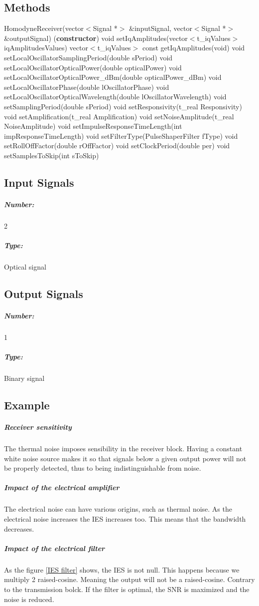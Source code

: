 \pagebreak

\subsection*{Methods}

HomodyneReceiver(vector$<$Signal *$>$ \&inputSignal, vector$<$Signal *$>$
\&outputSignal) (\textbf{constructor})
\bigbreak
void setIqAmplitudes(vector$<$t\_iqValues$>$ iqAmplitudesValues)
\bigbreak
vector$<$t\_iqValues$>$ const getIqAmplitudes(void)
\bigbreak
void setLocalOscillatorSamplingPeriod(double sPeriod)
\bigbreak
void setLocalOscillatorOpticalPower(double opticalPower)
\bigbreak
void setLocalOscillatorOpticalPower\_dBm(double opticalPower\_dBm)
\bigbreak
void setLocalOscillatorPhase(double lOscillatorPhase)
\bigbreak
void setLocalOscillatorOpticalWavelength(double lOscillatorWavelength)
\bigbreak
void setSamplingPeriod(double sPeriod)
\bigbreak
void  setResponsivity(t\_real Responsivity)
\bigbreak
void setAmplification(t\_real Amplification)
\bigbreak
void setNoiseAmplitude(t\_real NoiseAmplitude)
\bigbreak
void setImpulseResponseTimeLength(int impResponseTimeLength)
\bigbreak
void setFilterType(PulseShaperFilter fType)
\bigbreak
void setRollOffFactor(double rOffFactor)
\bigbreak
void setClockPeriod(double per)
\bigbreak
void setSamplesToSkip(int sToSkip)


\subsection*{Input Signals}

\subparagraph*{Number:} 2

\subparagraph*{Type:} Optical signal

\subsection*{Output Signals}

\subparagraph*{Number:} 1

\subparagraph*{Type:} Binary signal

\subsection*{Example}
\subparagraph{Receiver sensitivity}
The thermal noise imposes sensibility in the receiver block. Having a constant white noise source makes it so that signals below a given output power will not be properly detected, thus to being indistinguishable from noise.
\subparagraph{Impact of the electrical amplifier}
The electrical noise can have various origins, such as thermal noise. As the electrical noise increases the IES increases too. This means that the bandwidth decreases.
\subparagraph{Impact of the electrical filter}
As the figure \ref{IES filter} shows, the IES is not null. This happens because we multiply 2 raised-cosine. Meaning the output will not be a raised-cosine. Contrary to the transmission bolck. If the filter is optimal, the SNR is maximized and the noise is reduced.

